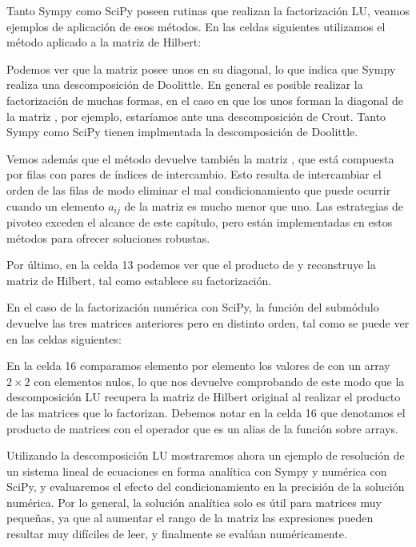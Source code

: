 Tanto Sympy como SciPy poseen rutinas que realizan la factorización LU, veamos ejemplos de aplicación de esos métodos. En las celdas siguientes utilizamos el método  aplicado a la matriz de Hilbert:

Podemos ver que la matriz  posee unos en su diagonal, lo que indica que Sympy realiza una descomposición de Doolittle. En general es posible realizar la factorización de muchas formas, en el caso en que los unos forman la diagonal de la matriz , por ejemplo, estaríamos ante una descomposición de Crout. Tanto Sympy como SciPy tienen implmentada la descomposición de Doolittle.

Vemos además que el método devuelve también la matriz , que está compuesta por filas con pares de índices de intercambio. Esto resulta de intercambiar el orden de las filas de modo eliminar el mal condicionamiento que puede ocurrir cuando un elemento $a_{ij}$ de la matriz es mucho menor que uno. Las estrategias de pivoteo exceden el alcance de este capítulo, pero están implementadas en estos métodos para ofrecer soluciones robustas.

Por último, en la celda 13 podemos ver que el producto de  y  reconstruye la matriz de Hilbert, tal como establece su factorización.

En el caso de la factorización numérica con SciPy, la función  del submódulo  devuelve las tres matrices anteriores pero en distinto orden, tal como se puede ver en las celdas siguientes:

En la celda 16 comparamos elemento por elemento los valores de  con un array $2 \times 2$ con elementos nulos, lo que nos devuelve  comprobando de este modo que la descomposición LU recupera la matriz de Hilbert original al realizar el producto de las matrices que lo factorizan. Debemos notar en la celda 16 que denotamos el producto de matrices con el operador  que es un alias de la función  sobre arrays.

Utilizando la descomposición LU mostraremos ahora un ejemplo de resolución de un sistema lineal de ecuaciones en forma analítica con Sympy y numérica con SciPy, y evaluaremos el efecto del condicionamiento en la precisión de la solución numérica. Por lo general, la solución analítica solo es útil para matrices muy pequeñas, ya que al aumentar el rango de la matriz las expresiones pueden resultar muy difíciles de leer, y finalmente se evalúan numéricamente. 

